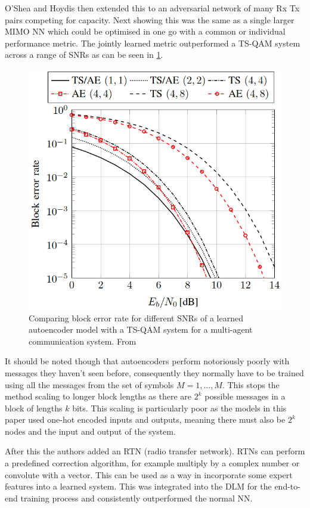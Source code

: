 \documentclass[12pt,onecolumn,letterpaper]{article}
\begin{document}
O'Shea and Hoydis then extended this to an adversarial network of many Rx Tx pairs competing for capacity. Next showing this was the same as a single larger MIMO NN which could be optimised in one go with a common or individual performance metric. The jointly learned metric outperformed a TS-QAM system across a range of SNRs as can be seen in \ref{fig:oSheaAutoencoderTsQam}.

\begin{figure}[t]
\begin{center}
   \includegraphics[width=0.8\linewidth]{figures/oShea_autoencoder_TS_QAM.PNG}
\end{center}
   \caption{Comparing block error rate for different SNRs of a learned autoencoder model with a TS-QAM system for a multi-agent communication system. From~\cite{oShea}}
\label{fig:oSheaAutoencoderTsQam}
\end{figure}

It should be noted though that autoencoders perform notoriously poorly with messages they haven't seen before, consequently they normally have to be trained using all the messages from the set of symbols $M = {1,...,M}$. This stops the method scaling to longer block lengths as there are $2^k$ possible messages in a block of lengths $k$ bits. This scaling is particularly poor as the models in this paper used one-hot encoded inputs and outputs, meaning there must also be $2^k$ nodes and the input and output of the system.

After this the authors added an RTN (radio transfer network). RTNs can perform a predefined correction algorithm, for example multiply by a complex number or convolute with a vector. This can be used as a way in incorporate some expert features into a learned system. This was integrated into the DLM for the end-to-end training process and consistently outperformed the normal NN. 
\end{document}
